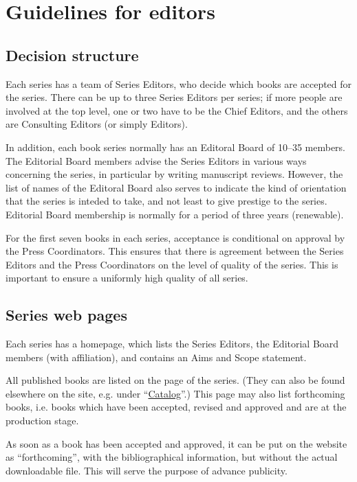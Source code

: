 
\chapter{Guidelines for editors}

\section{Decision structure}


Each \lsp series has a team of Series Editors, who decide which books are accepted for the
series. There can be up to three Series Editors per series; if more people are involved at the top
level, one or two have to be the Chief Editors, and the others are Consulting Editors (or simply
Editors).

In addition, each book series normally has an Editoral Board of 10--35 members. The Editorial Board
members advise the Series Editors in various ways concerning the series, in particular by writing
manuscript reviews. However, the list of names of the Editoral Board also serves to indicate the
kind of orientation that the series is inteded to take, and not least to give prestige to the
series. Editorial Board membership is normally for a period of three years (renewable).

For the first seven books in each series, acceptance is conditional on approval by the Press
Coordinators. This ensures that there is agreement between the Series Editors and the Press
Coordinators on the level of quality of the series. This is important to ensure a uniformly high
quality of all series.

\section{Series web pages}

Each series has a homepage, which lists the Series Editors, the Editorial Board members (with
affiliation), and contains an Aims and Scope statement.

All published books are listed on the page of the series. (They can also be found elsewhere on the
\lsp site, e.g. under ``\href{http://langsci-press.org/catalog}{Catalog}''.) This page may also list
forthcoming books, i.e. books which have been accepted, revised and approved and are at the
production stage.

As soon as a book has been accepted and approved, it can be put on the website as ``forthcoming'',
with the bibliographical information, but without the actual downloadable file. This will serve the
purpose of advance publicity.


